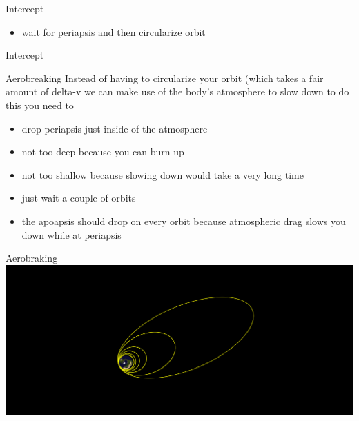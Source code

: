 {\begin{frame}[t]{Intercept}
\begin{block}{}
\begin{itemize}
            \item wait for periapsis and then circularize orbit
        \end{itemize}
    \end{block}
\end{frame}
\begin{frame}[t]{Intercept}
    \begin{block}{Aerobreaking}
        Instead of having to circularize your orbit (which takes a fair amount of delta-v we can make use of the body's
        atmosphere to slow down to do this you need to
        \begin{itemize}
            \item drop periapsis just inside of the atmosphere
            \item not too deep because you can burn up
            \item not too shallow because slowing down would take a very long time
            \item just wait a couple of orbits
            \item the apoapsis should drop on every orbit because atmospheric drag slows you down while at periapsis
        \end{itemize}
    \end{block}
\end{frame}
}
\begin{frame}[t]{}
    \begin{block}{Aerobraking}
        \includegraphics[width=\textwidth]{images/aerobraking}
    \end{block}
\end{frame}
